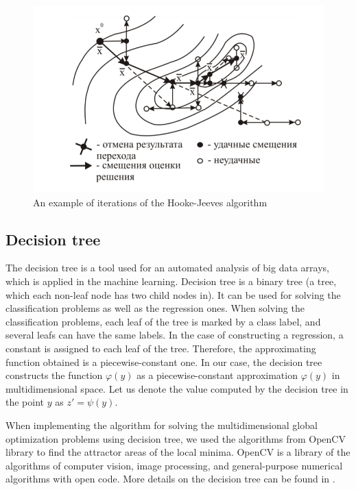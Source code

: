 \documentclass{svproc}
\begin{document}
\begin{figure}[!h] 
	\begin{center} 
		\begin{minipage}[h]{0.8\linewidth} 
			\includegraphics[width=1\linewidth]{figure/fig1.png} 
			\caption{An example of iterations of the Hooke-Jeeves algorithm} %
			\label{fig:fig1} 
		\end{minipage} 
	\end{center} 
\end{figure}	



\subsection{Decision tree}\label{SecDT}

The decision tree is a tool used for an automated analysis of big data arrays, which is applied in the  machine learning. Decision tree is a binary tree (a tree, which each non-leaf node has two child nodes  in). It can be used for solving the classification problems as well as the regression ones. When solving  the classification problems, each leaf of the tree is marked by a class label, and several leafs can have  the same labels. In the case of constructing a regression, a constant is assigned to each leaf of the tree.   Therefore, the approximating function obtained is a piecewise-constant one. In our case, the decision tree constructs the function $\varphi(y)$ as a piecewise-constant  approximation $\varphi(y)$  in multidimensional space. Let us denote the value  computed by the  decision tree in the point $y$ as $z' = \psi(y)$.

When implementing the algorithm for solving the multidimensional global optimization problems using  decision tree, we used the algorithms from OpenCV library to find the attractor areas of the local  minima. OpenCV is a library of the algorithms of computer vision, image processing, and  general-purpose numerical algorithms with open code. More details on the decision tree can be found  in \cite{fio_bib16}.
\end{document}
